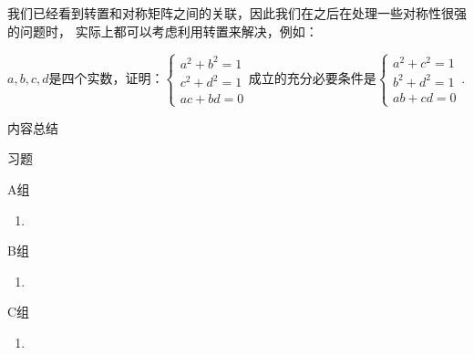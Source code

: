 我们已经看到转置和对称矩阵之间的关联，因此我们在之后在处理一些对称性很强的问题时，
实际上都可以考虑利用转置来解决，例如：
\begin{example}
    $a,b,c,d$是四个实数，证明：$\begin{cases}
		a^2+b^2=1 \\ c^2+d^2=1 \\ ac+bd=0
	\end{cases}$成立的充分必要条件是$\begin{cases}
		a^2+c^2=1 \\ b^2+d^2=1 \\ ab+cd=0
	\end{cases}$.
\end{example}
\begin{solution}

\end{solution}

\vspace{2ex}
\centerline{\heiti \Large 内容总结}

\vspace{2ex}

\centerline{\heiti \Large 习题}
\vspace{2ex}
{\kaishu }
\begin{flushright}
    \kaishu

\end{flushright}
\centerline{\heiti A组}
\begin{enumerate}
    \item
\end{enumerate}
\centerline{\heiti B组}
\begin{enumerate}
    \item
\end{enumerate}
\centerline{\heiti C组}
\begin{enumerate}
    \item
\end{enumerate}
